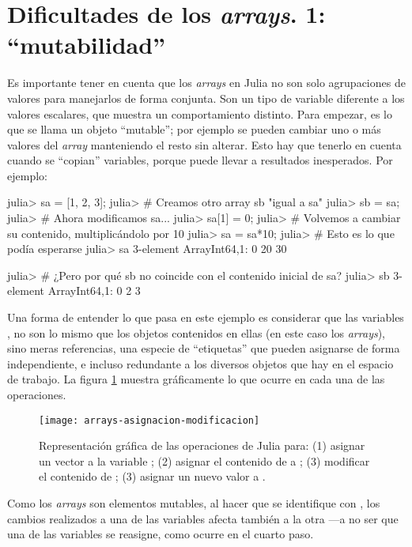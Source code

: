 \section{Dificultades de los \emph{arrays}. 1: ``mutabilidad''}

Es importante tener en cuenta que los \emph{arrays} en Julia no son solo agrupaciones de valores para manejarlos de forma conjunta. Son un tipo de variable diferente a los valores escalares, que muestra un comportamiento distinto. Para empezar, es lo que se llama un objeto ``mutable''; por ejemplo se pueden cambiar uno o más valores del \emph{array} manteniendo el resto sin alterar. Esto hay que tenerlo en cuenta cuando se ``copian'' variables, porque puede llevar a resultados inesperados. Por ejemplo:

\begin{jlconcode}
julia> sa = [1, 2, 3];
julia> # Creamos otro array sb "igual a sa"
julia> sb = sa;
julia> # Ahora modificamos sa...
julia> sa[1] = 0;
julia> # Volvemos a cambiar su contenido, multiplicándolo por 10
julia> sa = sa*10;
julia> # Esto es lo que podía esperarse
julia> sa
3-element Array{Int64,1}:
  0
 20
 30

julia> # ¿Pero por qué sb no coincide con el contenido inicial de sa?
julia> sb
3-element Array{Int64,1}:
 0
 2
 3
\end{jlconcode}

Una forma de entender lo que pasa en este ejemplo es considerar que las variables ,  no son lo mismo que los objetos contenidos en ellas (en este caso los \emph{arrays}), sino meras referencias, una especie de ``etiquetas'' que pueden asignarse de forma independiente, e incluso redundante a los diversos objetos que hay en el espacio de trabajo. La figura \ref{fig:arrays-asignacion-modificacion} muestra gráficamente lo que ocurre en cada una de las operaciones.

\begin{figure}
\centering
\texttt{[image: arrays-asignacion-modificacion]}
\caption{Representación gráfica de las operaciones de Julia para: (1) asignar un vector a la variable ; (2) asignar el contenido de  a ; (3) modificar el contenido de ; (3) asignar un nuevo valor a .}
\label{fig:arrays-asignacion-modificacion}
\end{figure}

Como los \emph{arrays} son elementos mutables, al hacer que  se identifique con , los cambios realizados a una de las variables afecta también a la otra ---a no ser que una de las variables se reasigne, como ocurre en el cuarto paso.

